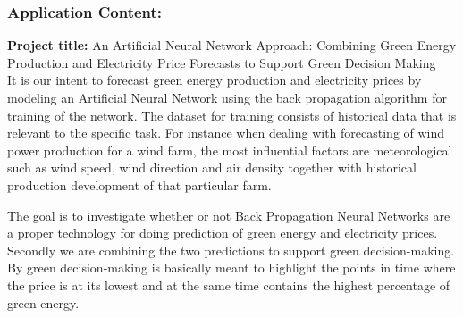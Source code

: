 \documentclass[twoside,11pt,openright]{report}
\begin{document}
\subsubsection{Application Content:}
\textbf{Project title:} An Artificial Neural Network Approach: Combining Green Energy Production and Electricity Price Forecasts to Support Green Decision Making
\\[0.5cm]
It is our intent to forecast green energy production and electricity prices by modeling an Artificial Neural Network using the back propagation algorithm for training of the network. The dataset for training consists of historical data that is relevant to the specific task. For instance when dealing with forecasting of wind power production for a wind farm, the most influential factors are meteorological such as wind speed, wind direction and air density together with historical production development of that particular farm. 

The goal is to investigate whether or not Back Propagation Neural Networks are a proper technology for doing prediction of green energy and electricity prices. Secondly we are combining the two predictions to support green decision-making. By green decision-making is basically meant to highlight the points in time where the price is at its lowest and at the same time contains the highest percentage of green energy.
\end{document}
